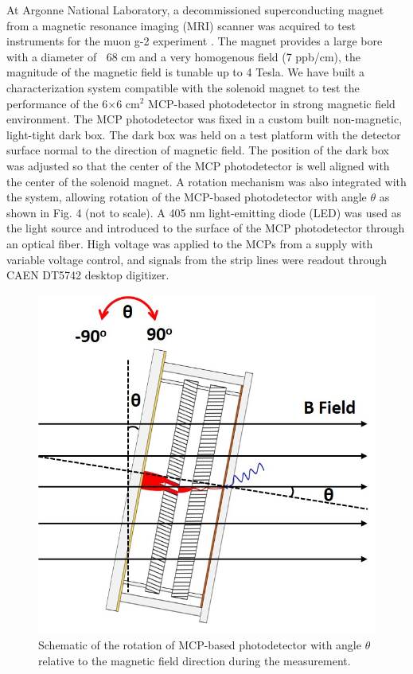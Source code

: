\documentclass[preprint,5p]{elsarticle}
\begin{document}
At Argonne National Laboratory, a decommissioned superconducting magnet from a 
magnetic resonance imaging (MRI) scanner was acquired to test instruments for 
the muon g-2 experiment \cite{Magnet}. The magnet provides a large bore with a 
diameter of $~$ 68 cm and a very homogenous field (7 ppb/cm), the magnitude of 
the magnetic field is tunable up to 4 Tesla. We have built a characterization 
system compatible with the solenoid magnet to test the performance of the 
6$\times$6 cm$^2$ MCP-based photodetector in strong magnetic field environment.  
The MCP photodetector was fixed in a custom built non-magnetic, light-tight 
dark box. The dark box was held on a test platform with the detector surface 
normal to the direction of magnetic field. The position of the dark box was 
adjusted so that the center of the MCP photodetector is well aligned with the 
center of the solenoid magnet. A rotation mechanism was also integrated with 
the system, allowing rotation of the MCP-based photodetector with angle 
$\theta$ as shown in Fig. 4 (not to scale). A 405 nm light-emitting diode (LED) 
was used as the light source and introduced to the surface of the MCP 
photodetector through an optical fiber. High voltage was applied to the MCPs 
from a supply with variable voltage control, and signals from the strip lines 
were readout through CAEN DT5742 desktop digitizer.

\begin{figure}[tbp]
\centering 
\includegraphics[scale=0.27]{fig/MCPs_theta_rotation.png}
\caption{Schematic of the rotation of MCP-based photodetector with angle 
$\theta$ relative to the magnetic field direction during the measurement.} 
\label{fig:MCPs_theta_rotation}
\end{figure}
\end{document}
